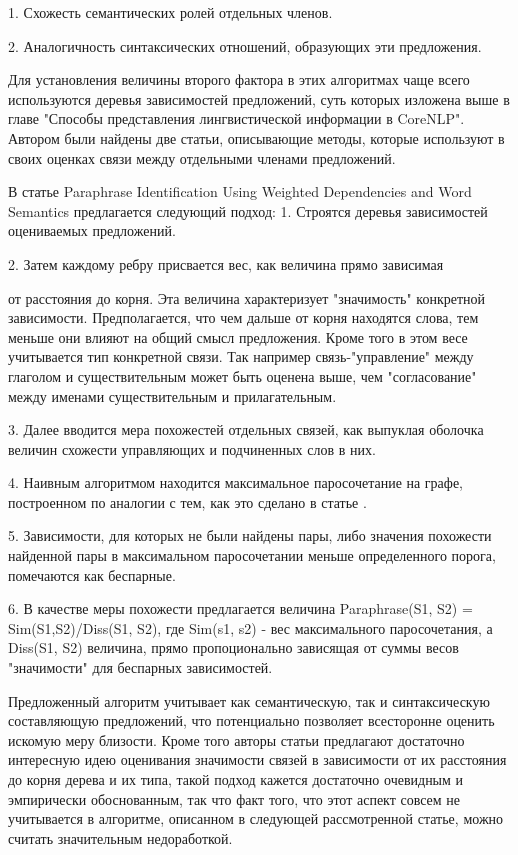 1. Схожесть семантических ролей отдельных членов.

2. Аналогичность синтаксических отношений, образующих эти предложения.

Для установления величины второго фактора в этих алгоритмах чаще всего используются
деревья зависимостей предложений, суть которых изложена выше в главе "Способы представления лингвистической информации в CoreNLP".
Автором были найдены две статьи, описывающие методы, 
которые используют в своих оценках связи между отдельными членами предложений.

В статье Paraphrase Identification Using Weighted Dependencies and Word Semantics\cite{weightedDep}
предлагается следующий подход:
1. Строятся деревья зависимостей оцениваемых предложений.

2. Затем каждому ребру присвается вес, как величина прямо зависимая

от расстояния до корня. Эта величина характеризует "значимость" конкретной зависимости.
Предполагается, что чем дальше от корня находятся слова, тем меньше они влияют
на общий смысл предложения. Кроме того в этом весе учитывается тип конкретной связи.
Так например связь-"управление" между глаголом и существительным
может быть оценена выше, чем "согласование" между именами существительным и прилагательным.

3. Далее вводится мера похожестей отдельных связей, как выпуклая оболочка 
величин схожести управляющих и подчиненных слов в них.

4. Наивным алгоритмом находится максимальное паросочетание на графе,
построенном по аналогии с тем, как это сделано в статье \cite{wordnetSim}.

5. Зависимости, для которых не были найдены пары, либо значения похожести
найденной пары в максимальном паросочетании меньше определенного порога,
помечаются как беспарные.

6. В качестве меры похожести предлагается величина 
Paraphrase(S1, S2) = Sim(S1,S2)/Diss(S1, S2), 
где Sim(s1, s2) - вес максимального паросочетания,
а Diss(S1, S2) величина, прямо пропоционально зависящая от 
суммы весов "значимости" для беспарных зависимостей.

Предложенный алгоритм учитывает как семантическую, так и синтаксическую составляющую
предложений, что потенциально позволяет всесторонне оценить искомую меру близости.
Кроме того авторы статьи предлагают достаточно интересную идею оценивания значимости связей
в зависимости от их расстояния до корня дерева и  их типа, такой подход кажется достаточно очевидным
и эмпирически обоснованным, так что факт того, что этот аспект совсем не учитывается в алгоритме,
описанном в следующей рассмотренной статье, можно считать значительным недоработкой.

